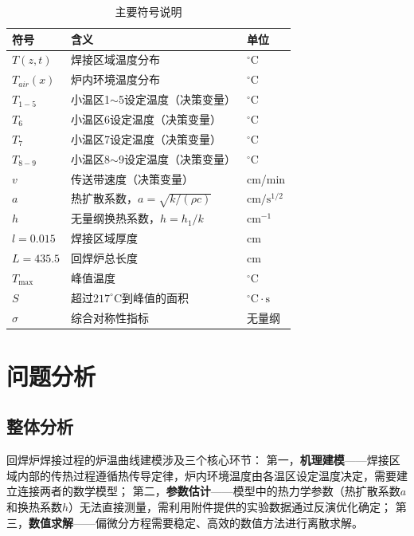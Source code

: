 \documentclass[12pt,a4paper]{ctexart}
\begin{document}
\begin{table}[H]
\centering
\caption{主要符号说明}
\label{tab:symbols}
\begin{tabular}{p{3.3cm}p{9.3cm}p{2.5cm}}
\toprule
\textbf{符号} & \textbf{含义} & \textbf{单位} \\
\midrule
$T(z,t)$   & 焊接区域温度分布 & $^{\circ}\mathrm{C}$ \\
$T_{air}(x)$ & 炉内环境温度分布 & $^{\circ}\mathrm{C}$ \\
$T_{1-5}$  & 小温区1$\sim$5设定温度（决策变量） & $^{\circ}\mathrm{C}$ \\
$T_{6}$    & 小温区6设定温度（决策变量） & $^{\circ}\mathrm{C}$ \\
$T_{7}$    & 小温区7设定温度（决策变量） & $^{\circ}\mathrm{C}$ \\
$T_{8-9}$  & 小温区8$\sim$9设定温度（决策变量） & $^{\circ}\mathrm{C}$ \\
$v$        & 传送带速度（决策变量） & cm/min \\
$a$        & 热扩散系数，$a=\sqrt{k/(\rho c)}$ & $\mathrm{cm}/\mathrm{s}^{1/2}$ \\
$h$        & 无量纲换热系数，$h=h_1/k$ & $\mathrm{cm}^{-1}$ \\
$l=0.015$  & 焊接区域厚度 & cm \\
$L=435.5$  & 回焊炉总长度 & cm \\
$T_{\max}$ & 峰值温度 & $^{\circ}\mathrm{C}$ \\
$S$        & 超过$217^{\circ}\mathrm{C}$到峰值的面积 & $^{\circ}\mathrm{C}\!\cdot\!\mathrm{s}$ \\
$\sigma$   & 综合对称性指标 & 无量纲 \\
\bottomrule
\end{tabular}
\end{table}

\section{问题分析}

\subsection{整体分析}

回焊炉焊接过程的炉温曲线建模涉及三个核心环节：
第一，\textbf{机理建模}——焊接区域内部的传热过程遵循热传导定律，炉内环境温度由各温区设定温度决定，需要建立连接两者的数学模型；
第二，\textbf{参数估计}——模型中的热力学参数（热扩散系数$a$和换热系数$h$）无法直接测量，需利用附件提供的实验数据通过反演优化确定；
第三，\textbf{数值求解}——偏微分方程需要稳定、高效的数值方法进行离散求解。
\end{document}
